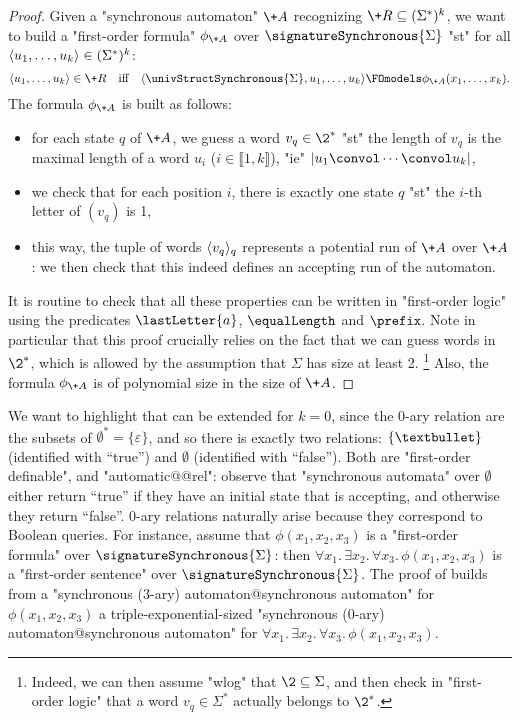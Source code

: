 \begin{proof}
	Given a "synchronous automaton" $\+A$ recognizing $\+R \subseteq (\Sigma^*)^k$,
	we want to build a "first-order formula" $\phi_{\+A}$ over $\signatureSynchronous{\Sigma}$
	"st" for all $\langle u_1,\dotsc, u_k\rangle \in (\Sigma^*)^k$:
	\[
		\tup{u_1,\dotsc, u_k} \in \+R
		\quad\text{iff}\quad
		\tup{\univStructSynchronous{\Sigma}, u_1,\dotsc, u_k} \FOmodels \phi_{\+A}(x_1,\dotsc,x_k).
	\]
	The formula $\phi_{\+A}$ is built as follows:
	\begin{itemize}
		\item for each state $q$ of $\+A$, we guess a word $v_q \in \2^*$ "st"
			the length of $v_q$ is the maximal length of a word $u_i$ ($i \in \lBrack 1,k\rBrack$),
			"ie" $|u_1 \convol \cdots \convol u_k|$,
		\item we check that for each position $i$, there is exactly one state $q$
			"st" the $i$-th letter of $(v_q)$ is 1,
		\item this way, the tuple of words $\langle v_q\rangle_{q}$ represents a potential run of $\+A$
			over $\+A$: we then check that this indeed defines an accepting run of the automaton. 
	\end{itemize}
	It is routine to check that all these properties can be written in "first-order logic"
	using the predicates $\lastLetter{a}$, $\equalLength$ and $\prefix$.
	Note in particular that this proof crucially relies on the fact that we can guess words
	in $\2^*$, which is allowed by the assumption that $\Sigma$ has size at least 2.%
	\footnote{Indeed, we can then assume "wlog" that $\2 \subseteq \Sigma$, and then
	check in "first-order logic" that a word $v_q \in \Sigma^*$ actually
	belongs to $\2^*$.}
	Also, the formula $\phi_{\+A}$ is of polynomial size in the size of $\+A$.
\end{proof}

We want to highlight that  can be extended for $k=0$,
since the $0$-ary relation are the subsets of $\emptyset^* = \{\varepsilon\}$,
and so there is exactly two 
relations: $\{\textbullet\}$ (identified with ``true'') and $\emptyset$ (identified with ``false'').
Both are "first-order definable", and "automatic@@rel": observe that "synchronous automata" over
$\emptyset$ either return ``true'' if they have an initial state that is accepting, and otherwise they return ``false''.
$0$-ary relations naturally arise because they correspond to Boolean queries.
For instance, assume that $\phi(x_1,x_2,x_3)$ is a "first-order formula" over
$\signatureSynchronous{\Sigma}$: then
$\forall x_1.\, \exists x_2.\, \forall x_3.\, \phi(x_1,x_2,x_3)$ is a "first-order sentence"
over $\signatureSynchronous{\Sigma}$. The proof of 
builds from a "synchronous ($3$-ary) automaton@synchronous automaton" for
$\phi(x_1,x_2,x_3)$ a triple-exponential-sized "synchronous ($0$-ary) automaton@synchronous automaton" for $\forall x_1.\, \exists x_2.\, \forall x_3.\, \phi(x_1,x_2,x_3)$.

